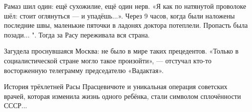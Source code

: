 Рамаз шил один: ещё сухожилие, ещё один нерв. «Я как по натянутой проволоке
шёл: стоит оглянуться --- и упадёшь...». Через 9 часов, когда были наложены
последние швы, маленькие пяточки в ладонях доктора потеплели. Пропасть была
позади... ". Тогда за Расу переживала вся страна.

Загудела проснувшаяся Москва: не было в мире таких прецедентов. «Только в
социалистической стране могло такое произойти», --- отстучал кто-то восторженную
телеграмму председателю «Вадактая».

История трёхлетней Расы Прасцевичюте и уникальная операция советских врачей,
которая изменила жизнь одного ребёнка, стали символом сплочённости СССР...
